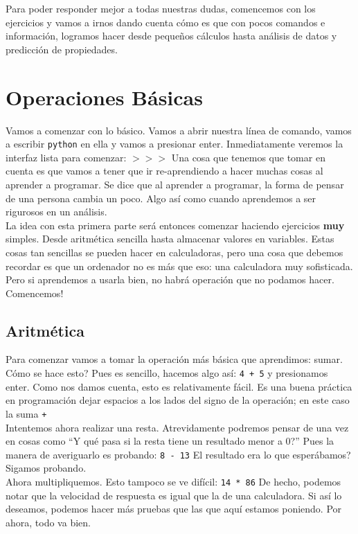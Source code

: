 \documentclass[10pt,letterpaper]{article}
\newcommand{\inlinecode}[1]{
\colorbox{light-gray}{\texttt{#1}}
}
\begin{document}
Para poder responder mejor a todas nuestras dudas, comencemos con los ejercicios y vamos a irnos dando cuenta c\'omo es que con pocos comandos e informaci\'on, logramos hacer desde peque\~nos c\'alculos hasta an\'alisis de datos y predicci\'on de propiedades.\\

\section{Operaciones B\'asicas}
Vamos a comenzar con lo b\'asico. Vamos a abrir nuestra l\'inea de comando, vamos a escribir \inlinecode{python} en ella y vamos a presionar enter. Inmediatamente veremos la interfaz lista para comenzar: \inlinecode{$>>>$} Una cosa que tenemos que tomar en cuenta es que vamos a tener que ir re-aprendiendo a hacer muchas cosas al aprender a programar. Se dice que al aprender a programar, la forma de pensar de una persona cambia un poco. Algo as\'i como cuando aprendemos a ser rigurosos en un an\'alisis.\\

La idea con esta primera parte ser\'a entonces comenzar haciendo ejercicios \textbf{muy} simples. Desde aritm\'etica sencilla hasta almacenar valores en variables. Estas cosas tan sencillas se pueden hacer en calculadoras, pero una cosa que debemos recordar es que un ordenador no es m\'as que eso: una calculadora muy sofisticada. Pero si aprendemos a usarla bien, no habr\'a operaci\'on que no podamos hacer. Comencemos!

\subsection{Aritm\'etica}
Para comenzar vamos a tomar la operaci\'on m\'as b\'asica que aprendimos: sumar. C\'omo se hace esto? Pues es sencillo, hacemos algo as\'i: \inlinecode{4\ +\ 5} y presionamos enter. Como nos damos cuenta, esto es relativamente f\'acil. Es una buena pr\'actica en programaci\'on dejar espacios a los lados del signo de la operaci\'on; en este caso la suma \inlinecode{+}\\

Intentemos ahora realizar una resta. Atrevidamente podremos pensar de una vez en cosas como ``Y qu\'e pasa si la resta tiene un resultado menor a 0?'' Pues la manera de averiguarlo es probando: \inlinecode{8\ -\ 13} El resultado era lo que esper\'abamos? Sigamos probando.\\

Ahora multipliquemos. Esto tampoco se ve dif\'icil: \inlinecode{14\ *\ 86} De hecho, podemos notar que la velocidad de respuesta es igual que la de una calculadora. Si as\'i lo deseamos, podemos hacer m\'as pruebas que las que aqu\'i estamos poniendo. Por ahora, todo va bien.\\
\end{document}
